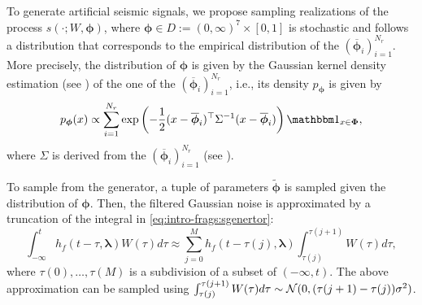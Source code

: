 To generate artificial seismic signals, we propose sampling realizations of the process $s(\cdot;W,\boldsymbol{\phi})$, where $\boldsymbol{\phi}\in D:=(0,\infty)^7\times[0,1]$ is stochastic and follows a distribution that corresponds to the empirical distribution of the $(\overline{\boldsymbol{\phi}}_i)_{i=1}^{N_r}$. More precisely, the distribution of $\boldsymbol{\phi}$ is  given by the Gaussian kernel density estimation (see \cite{kristan_multivariate_2011}) of the one of the $(\overline{\boldsymbol\phi}_i)_{i=1}^{N_r}$, i.e., its density $p_{\boldsymbol{\phi}}$ is given by
\begin{equation}
    p_{\boldsymbol{\phi}}(x) \propto \sum_{i=1}^{N_r}\exp\left( -\frac{1}{2} (x-\overline{\boldsymbol\phi}_i)^\top\Sigma^{-1}(x-\overline{\boldsymbol\phi}_i) \right)\indic_{x\in\boldsymbol{\Phi}},
\end{equation}
where $\Sigma$ is derived from the $(\overline{\boldsymbol{\phi}}_i)_{i=1}^{N_r}$ (see \cite{kristan_multivariate_2011}).

To sample from the generator, a tuple of parameters $\tilde{\boldsymbol{\phi}}$ is sampled given the distribution of $\boldsymbol{\phi}$. Then, the filtered Gaussian noise is approximated by a truncation of the integral in \cref{eq:intro-frags:sgenertor}:
    \begin{equation}
        \int_{-\infty}^t h_f(t-\tau,\boldsymbol\lambda)W(\tau)d\tau \approx \sum_{j=0}^{M}h_f(t- \tau(j),\boldsymbol{\lambda} ) \int_{\tau(j)}^{\tau(j+1)}W(\tau)d\tau, %
    \end{equation}
where $\tau(0),\dots,\tau(M)$ is a subdivision of a subset of $(-\infty,t)$.
The above approximation can be sampled using $\int_{\tau(j)}^{\tau(j+1)}W(\tau)d\tau\sim\mathcal{N}(0,(\tau(j+1)-\tau(j))\sigma^2)$.







